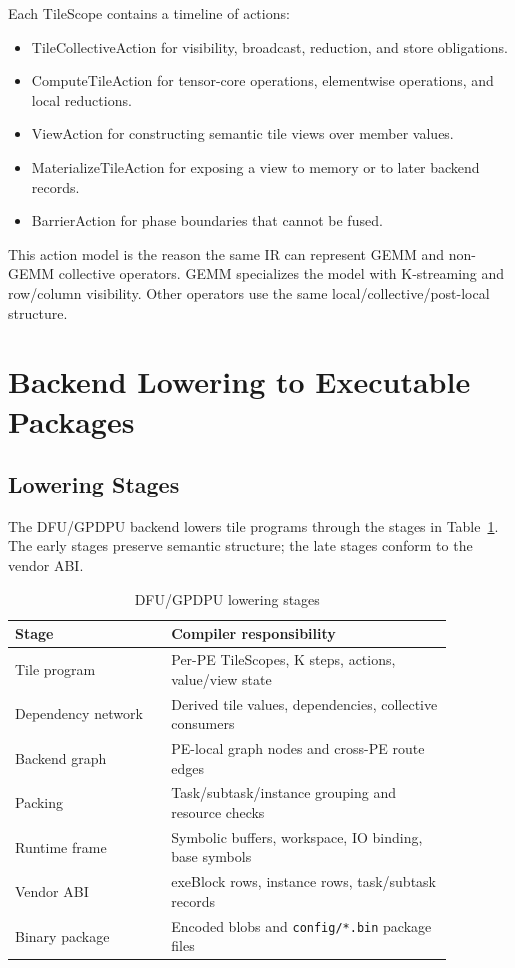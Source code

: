 \documentclass[conference]{IEEEtran}
\newcommand{\targetbackend}{DFU/GPDPU}
\begin{document}
Each TileScope contains a timeline of actions:
\begin{itemize}
\item TileCollectiveAction for visibility, broadcast, reduction, and store
obligations.
\item ComputeTileAction for tensor-core operations, elementwise operations, and
local reductions.
\item ViewAction for constructing semantic tile views over member values.
\item MaterializeTileAction for exposing a view to memory or to later backend
records.
\item BarrierAction for phase boundaries that cannot be fused.
\end{itemize}

This action model is the reason the same IR can represent GEMM and non-GEMM
collective operators. GEMM specializes the model with K-streaming and row/column
visibility. Other operators use the same local/collective/post-local structure.

\section{Backend Lowering to Executable Packages}

\subsection{Lowering Stages}

The \targetbackend{} backend lowers tile programs through the stages in
Table~\ref{tab:lowering}. The early stages preserve semantic structure; the
late stages conform to the vendor ABI.

\begin{table}[t]
\caption{\targetbackend{} lowering stages}
\label{tab:lowering}
\centering
\begin{tabular}{p{0.31\linewidth}p{0.56\linewidth}}
\toprule
\textbf{Stage} & \textbf{Compiler responsibility} \\
\midrule
Tile program & Per-PE TileScopes, K steps, actions, value/view state \\
Dependency network & Derived tile values, dependencies, collective consumers \\
Backend graph & PE-local graph nodes and cross-PE route edges \\
Packing & Task/subtask/instance grouping and resource checks \\
Runtime frame & Symbolic buffers, workspace, IO binding, base symbols \\
Vendor ABI & exeBlock rows, instance rows, task/subtask records \\
Binary package & Encoded blobs and \texttt{config/*.bin} package files \\
\bottomrule
\end{tabular}
\end{table}
\end{document}
